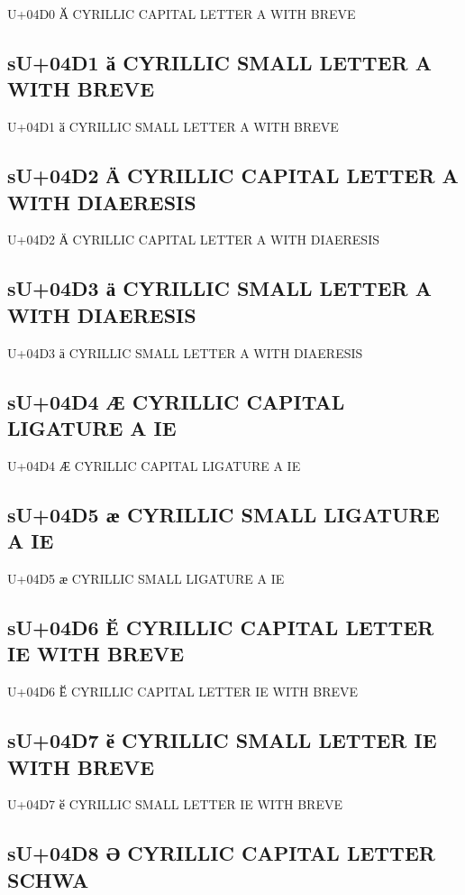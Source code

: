 U+04D0 Ӑ  CYRILLIC CAPITAL LETTER A WITH BREVE

\subsection{sU+04D1 ӑ  CYRILLIC SMALL LETTER A WITH BREVE}

U+04D1 ӑ  CYRILLIC SMALL LETTER A WITH BREVE

\subsection{sU+04D2 Ӓ  CYRILLIC CAPITAL LETTER A WITH DIAERESIS}

U+04D2 Ӓ  CYRILLIC CAPITAL LETTER A WITH DIAERESIS

\subsection{sU+04D3 ӓ  CYRILLIC SMALL LETTER A WITH DIAERESIS}

U+04D3 ӓ  CYRILLIC SMALL LETTER A WITH DIAERESIS

\subsection{sU+04D4 Ӕ  CYRILLIC CAPITAL LIGATURE A IE}

U+04D4 Ӕ  CYRILLIC CAPITAL LIGATURE A IE

\subsection{sU+04D5 ӕ  CYRILLIC SMALL LIGATURE A IE}

U+04D5 ӕ  CYRILLIC SMALL LIGATURE A IE

\subsection{sU+04D6 Ӗ  CYRILLIC CAPITAL LETTER IE WITH BREVE}

U+04D6 Ӗ  CYRILLIC CAPITAL LETTER IE WITH BREVE

\subsection{sU+04D7 ӗ  CYRILLIC SMALL LETTER IE WITH BREVE}

U+04D7 ӗ  CYRILLIC SMALL LETTER IE WITH BREVE

\subsection{sU+04D8 Ә  CYRILLIC CAPITAL LETTER SCHWA}

